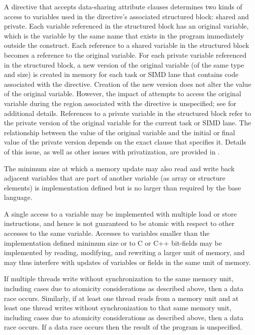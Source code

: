 A directive that accepts data-sharing attribute clauses determines two kinds of access to
variables used in the directive’s associated structured block: shared and private. Each
variable referenced in the structured block has an original variable, which is the variable  
by the same name that exists in the program immediately outside the construct. Each
reference to a shared variable in the structured block becomes a reference to the original 
variable. For each private variable referenced in the structured block, a new version of
the original variable (of the same type and size) is created in memory for each task or
SIMD lane that contains code associated with the directive. Creation of the new version
does not alter the value of the original variable. However, the impact of attempts to
access the original variable during the region associated with the directive is
unspecified; see  for additional details. References to a
private variable in the structured block refer to the private version of the original
variable for the current task or SIMD lane. The relationship between the value of the
original variable and the initial or final value of the private version depends on the exact
clause that specifies it. Details of this issue, as well as other issues with privatization,
are provided in .

The minimum size at which a memory update may also read and write back adjacent 
variables that are part of another variable (as array or structure elements) is
implementation defined but is no larger than required by the base language. 

A single access to a variable may be implemented with multiple load or store
instructions, and hence is not guaranteed to be atomic with respect to other accesses to
the same variable. Accesses to variables smaller than the implementation defined
minimum size or to C or C++ bit-fields may be implemented by reading, modifying, and 
rewriting a larger unit of memory, and may thus interfere with updates of variables or
fields in the same unit of memory.

If multiple threads write without synchronization to the same memory unit, including
cases due to atomicity considerations as described above, then a data race occurs.
Similarly, if at least one thread reads from a memory unit and at least one thread writes
without synchronization to that same memory unit, including cases due to atomicity
considerations as described above, then a data race occurs. If a data race occurs then the
result of the program is unspecified.

